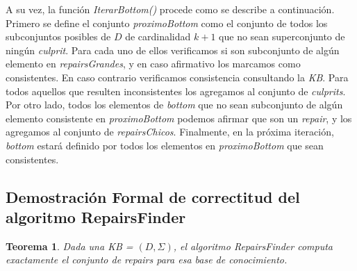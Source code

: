 \documentclass[11pt,a4paper,twoside]{tesis}
\begin{document}
A su vez, la función \textit{IterarBottom()} procede como se describe a continuación. Primero se define el conjunto \textit{proximoBottom} como el conjunto de todos los subconjuntos posibles de $D$ de cardinalidad $k + 1$ que no sean superconjunto de ningún \textit{culprit}. Para cada uno de ellos verificamos si son subconjunto de algún elemento en \textit{repairsGrandes}, y en caso afirmativo los marcamos como consistentes. En caso contrario verificamos consistencia consultando la \textit{KB}. Para todos aquellos que resulten inconsistentes los agregamos al conjunto de \textit{culprits}. Por otro lado, todos los elementos de \textit{bottom} que no sean subconjunto de algún elemento consistente en \textit{proximoBottom} podemos afirmar que son un \textit{repair}, y los agregamos al conjunto de \textit{repairsChicos}. Finalmente, en la próxima iteración, \textit{bottom} estará definido por todos los elementos en \textit{proximoBottom} que sean consistentes.

\subsection{Demostración Formal de correctitud del algoritmo RepairsFinder}\label{demostracion_formal}

\newtheorem{theorem}{Teorema} 
\newtheorem{lemma}[theorem]{Lema}

\begin{theorem}
Dada una \textit{KB} = $(D, \Sigma)$, el algoritmo \textit{RepairsFinder} computa exactamente el conjunto de \textit{repairs} para esa base de conocimiento.
\end{theorem}
\end{document}
